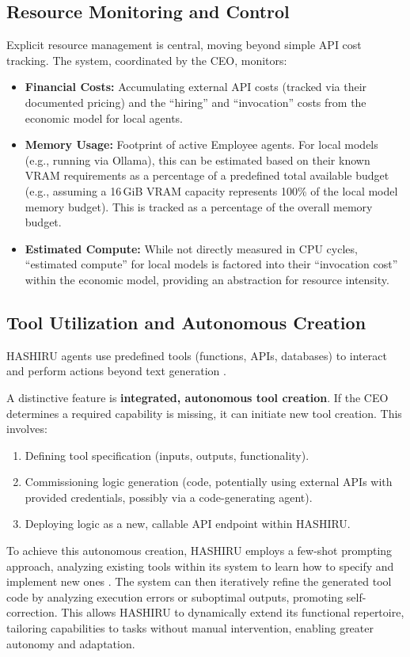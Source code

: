 \documentclass[conference]{IEEEtran}
\begin{document}
\subsection{Resource Monitoring and Control}
\label{subsec:resource_mgmt}
Explicit resource management is central, moving beyond simple API cost tracking. The system, coordinated by the CEO, monitors:
\begin{itemize}
    \item \textbf{Financial Costs:} Accumulating external API costs (tracked via their documented pricing) and the ``hiring'' and ``invocation'' costs from the economic model for local agents.
    \item \textbf{Memory Usage:} Footprint of active Employee agents. For local models (e.g., running via Ollama), this can be estimated based on their known VRAM requirements as a percentage of a predefined total available budget (e.g., assuming a 16\,GiB VRAM capacity represents 100\% of the local model memory budget). This is tracked as a percentage of the overall memory budget.
    \item \textbf{Estimated Compute:} While not directly measured in CPU cycles, ``estimated compute'' for local models is factored into their ``invocation cost'' within the economic model, providing an abstraction for resource intensity.
\end{itemize}
\subsection{Tool Utilization and Autonomous Creation}
\label{subsec:tooling}
HASHIRU agents use predefined tools (functions, APIs, databases) to interact and perform actions beyond text generation \cite{yao2022react, openai_func_calling}.

A distinctive feature is \textbf{integrated, autonomous tool creation}. If the CEO determines a required capability is missing, it can initiate new tool creation. This involves:
\begin{enumerate}
    \item Defining tool specification (inputs, outputs, functionality).
    \item Commissioning logic generation (code, potentially using external APIs with provided credentials, possibly via a code-generating agent).
    \item Deploying logic as a new, callable API endpoint within HASHIRU.
\end{enumerate}
To achieve this autonomous creation, HASHIRU employs a few-shot prompting approach, analyzing existing tools within its system to learn how to specify and implement new ones \cite{brown2020language}. The system can then iteratively refine the generated tool code by analyzing execution errors or suboptimal outputs, promoting self-correction. This allows HASHIRU to dynamically extend its functional repertoire, tailoring capabilities to tasks without manual intervention, enabling greater autonomy and adaptation.
\end{document}
